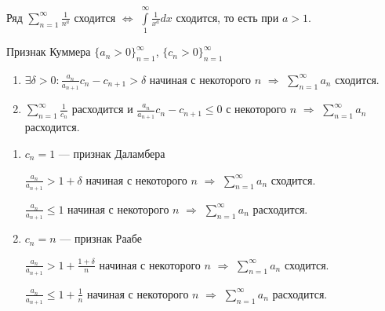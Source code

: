 \begin{example}{}{}
    Ряд \( \sum\limits_{n = 1}^{\infty} \frac{1}{n^a} \) сходится
    \( \Leftrightarrow \)
    \( \int\limits_{1}^{\infty} \frac{1}{x^a} dx \) сходится,
    то есть при \( a > 1 \).
\end{example}

\begin{thrm}{Признак Куммера}{}
    \( \{ a_n > 0 \}_{n = 1}^{\infty} \), \( \{ c_n > 0 \}_{n = 1}^{\infty} \)

    \begin{enumerate}
        \item
            \( \exists \delta > 0 : \frac{a_n}{a_{n + 1}} c_n - c_{n + 1} > \delta \)
            начиная с некоторого \( n \)
            \( \Rightarrow \)
            \( \sum\limits_{n = 1}^{\infty} a_n \) сходится.
        \item
            \( \sum\limits_{n = 1}^{\infty} \frac{1}{c_n} \) расходится
            и \( \frac{a_n}{a_{n + 1}} c_n - c_{n + 1} \leq 0 \) с некоторого \( n \)
            \( \Rightarrow \) \( \sum\limits_{n = 1}^{\infty} a_n \) расходится.
    \end{enumerate}
\end{thrm}

\begin{example}{}{}
    \begin{enumerate}
        \item
            \( c_n = 1 \) --- признак Даламбера

            \( \frac{a_n}{a_{n + 1}} > 1 + \delta \) начиная с некоторого \( n \)
            \( \Rightarrow \)
            \( \sum\limits_{n = 1}^{\infty} a_n \) сходится.

            \( \frac{a_n}{a_{n + 1}} \leq 1 \) начиная с некоторого \( n \)
            \( \Rightarrow \)
            \( \sum\limits_{n = 1}^{\infty} a_n \) расходится.
        \item
            \( c_n = n \) --- признак Раабе

            \( \frac{a_n}{a_{n + 1}} > 1 + \frac{1 + \delta}{n} \) начиная с некоторого \( n \)
            \( \Rightarrow \)
            \( \sum\limits_{n = 1}^{\infty} a_n \) сходится.

            \( \frac{a_n}{a_{n + 1}} \leq 1 + \frac{1}{n} \) начиная с некоторого \( n \)
            \( \Rightarrow \)
            \( \sum\limits_{n = 1}^{\infty} a_n \) расходится.
    \end{enumerate}
\end{example}

